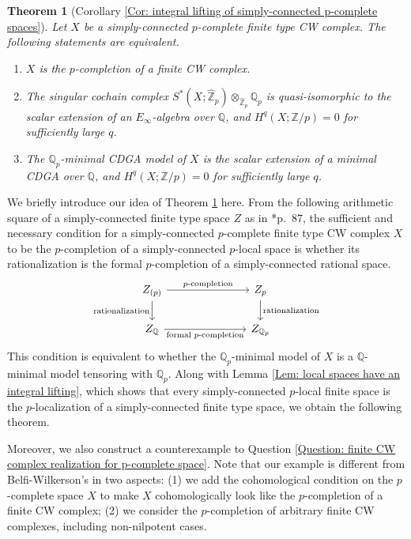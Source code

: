 \documentclass[11pt]{amsart}
\newtheorem{theorem}{Theorem}[section]
\theoremstyle{definition}
\numberwithin{equation}{section}
\numberwithin{equation}{section}
\newcommand\QQ{\mathbb{Q}}
\newcommand\ZZ{\mathbb{Z}}
\begin{document}
\begin{theorem}[Corollary \ref{Cor: integral lifting of simply-connected p-complete spaces}]\label{Intro Thm: p-completion of a finite CW complex}
Let $X$ be a simply-connected $p$-complete finite type CW complex. The following statements are equivalent.
\begin{enumerate}[leftmargin=0.25in]
    \item $X$ is the $p$-completion of a finite CW complex.
    \item The singular cochain complex $S^*(X;\widehat{\ZZ}_p)\otimes_{\widehat{\ZZ}_p} \QQ_p$ is quasi-isomorphic to the scalar extension of an $E_{\infty}$-algebra over $\QQ$, and $H^{q}(X;\ZZ/p)=0$ for sufficiently large $q$.
    \item The $\QQ_p$-minimal CDGA model of $X$ is the scalar extension of a minimal CDGA over $\QQ$, and $H^{q}(X;\ZZ/p)=0$ for sufficiently large $q$.
\end{enumerate}
\end{theorem}

We briefly introduce our idea of Theorem \ref{Intro Thm: p-completion of a finite CW complex} here. From the following arithmetic square of a simply-connected finite type space $Z$ as in \cite{Sullivan-MIT-notes}*{p.~87}, the sufficient and necessary condition for a simply-connected $p$-complete finite type CW complex $X$ to be the $p$-completion of a simply-connected $p$-local space is whether its rationalization is the formal $p$-completion of a simply-connected rational space.
\[
\begin{tikzcd}
    Z_{(p)} \arrow[rrr,"\text{$p$-completion}"] \arrow[d,"\text{rationalization}"'] & & & Z_p \arrow[d,"\text{rationalization}"] \\
    Z_{\QQ} \arrow[rrr,"\text{formal $p$-completion}"'] & & &  Z_{\QQ_p}
\end{tikzcd}
\]
This condition is equivalent to whether the $\QQ_p$-minimal model of $X$ is a $\QQ$-minimal model tensoring with $\QQ_p$. Along with Lemma \ref{Lem: local spaces have an integral lifting}, which shows that every simply-connected $p$-local finite space is the $p$-localization of a simply-connected finite type space, we obtain the following theorem.



Moreover, we also construct a counterexample to Question \ref{Question: finite CW complex realization for p-complete space}. Note that our example is different from Belfi-Wilkerson's in two aspects: (1) we add the cohomological condition on the $p$-complete space $X$ to make $X$ cohomologically look like the $p$-completion of a finite CW complex; (2) we consider the $p$-completion of arbitrary finite CW complexes, including non-nilpotent cases.
\end{document}
